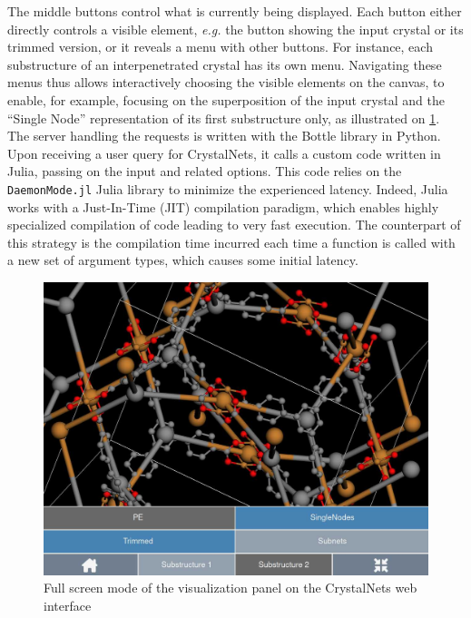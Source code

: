 \documentclass[main.tex]{subfiles}
\begin{document}
The middle buttons control what is currently being displayed. Each button either directly controls a visible element, \textit{e.g.} the button showing the input crystal or its trimmed version, or it reveals a menu with other buttons. For instance, each substructure of an interpenetrated crystal has its own menu. Navigating these menus thus allows interactively choosing the visible elements on the canvas, to enable, for example, focusing on the superposition of the input crystal and the ``Single Node'' representation of its first substructure only, as illustrated on \cref{fig:visualization}.\\


The server handling the requests is written with the Bottle library in Python. Upon receiving a user query for CrystalNets, it calls a custom code written in Julia, passing on the input and related options.
This code relies on the \texttt{DaemonMode.jl} Julia library to minimize the experienced latency. Indeed, Julia works with a Just-In-Time (JIT) compilation paradigm, which enables highly specialized compilation of code leading to very fast execution\autocite{JuliaDesign}. The counterpart of this strategy is the compilation time incurred each time a function is called with a new set of argument types, which causes some initial latency. %

\begin{figure}
	\centering
	\includegraphics[width=0.9\linewidth]{figures/topology/WebsiteFullscreen.jpg}
	\caption{Full screen mode of the visualization panel on the CrystalNets web interface}\label{fig:visualization}
\end{figure}
\end{document}
